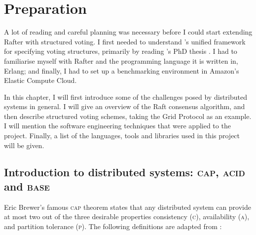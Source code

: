 \documentclass[draft,11pt,chapterprefix=true,toc=bibliography,numbers=noendperiod,
               footnotes=multiple,twoside]{scrreprt}
\begin{document}
\chapter{Preparation\label{ch:preparation}}

A lot of reading and careful planning was necessary before I could start extending Rafter with structured voting. I first needed to understand \citeauthor{generators}'s unified framework for specifying voting structures, primarily by reading \citeauthor{voting}'s PhD thesis \autocite{voting}. I had to familiarise myself with Rafter and the programming language it is written in, Erlang; and finally, I had to set up a benchmarking environment in Amazon's Elastic Compute Cloud.

In this chapter, I will first introduce some of the challenges posed by distributed systems in general. I will give an overview of the Raft consensus algorithm, and then describe structured voting schemes, taking the Grid Protocol as an example. I will mention the software engineering techniques that were applied to the project. Finally, a list of the languages, tools and libraries used in this project will be given.


\section[Introduction to distributed systems]{Introduction to distributed systems: \textsc{cap}, \textsc{acid} and \textsc{base}\label{ssc:cap-acid-and-base}}

Eric Brewer's famous \textsc{cap} theorem states that any distributed system can provide at most two out of the three desirable properties consistency (\textsc{c}), availability (\textsc{a}), and partition tolerance (\textsc{p}).\autocite{cap} The following definitions are adapted from \textcite{capproof}:
\end{document}
